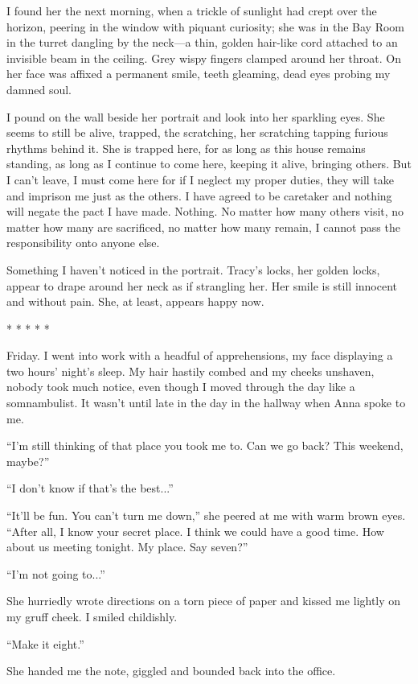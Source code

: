 \documentclass[
]{article}
\begin{document}
I found her the next morning, when a trickle of sunlight had crept over
the horizon, peering in the window with piquant curiosity; she was in
the Bay Room in the turret dangling by the neck---a thin, golden
hair-like cord attached to an invisible beam in the ceiling. Grey wispy
fingers clamped around her throat. On her face was affixed a permanent
smile, teeth gleaming, dead eyes probing my damned soul.

I pound on the wall beside her portrait and look into her sparkling
eyes. She seems to still be alive, trapped, the scratching, her
scratching tapping furious rhythms behind it. She is trapped here, for
as long as this house remains standing, as long as I continue to come
here, keeping it alive, bringing others. But I can't leave, I must come
here for if I neglect my proper duties, they will take and imprison me
just as the others. I have agreed to be caretaker and nothing will
negate the pact I have made. Nothing. No matter how many others visit,
no matter how many are sacrificed, no matter how many remain, I cannot
pass the responsibility onto anyone else.

Something I haven't noticed in the portrait. Tracy's locks, her golden
locks, appear to drape around her neck as if strangling her. Her smile
is still innocent and without pain. She, at least, appears happy now.

* * * * *

Friday. I went into work with a headful of apprehensions, my face
displaying a two hours' night's sleep. My hair hastily combed and my
cheeks unshaven, nobody took much notice, even though I moved through
the day like a somnambulist. It wasn't until late in the day in the
hallway when Anna spoke to me.

``I'm still thinking of that place you took me to. Can we go back? This
weekend, maybe?''

``I don't know if that's the best...''

``It'll be fun. You can't turn me down,'' she peered at me with warm
brown eyes. ``After all, I know your secret place. I think we could have
a good time. How about us meeting tonight. My place. Say seven?''

``I'm not going to...''

She hurriedly wrote directions on a torn piece of paper and kissed me
lightly on my gruff cheek. I smiled childishly.

``Make it eight.''

She handed me the note, giggled and bounded back into the office.
\end{document}
